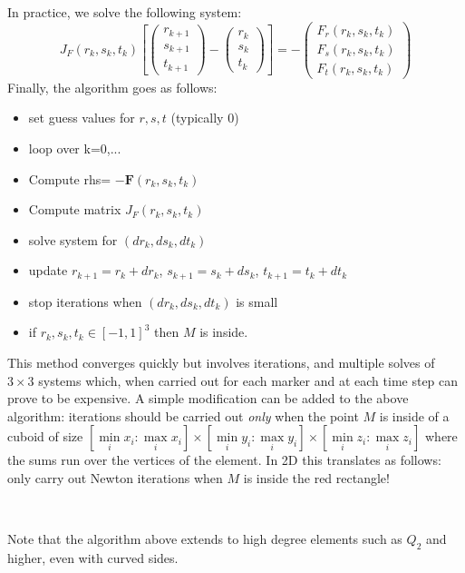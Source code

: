 In practice, we solve the following system:
\[
J_F(r_k,s_k,t_k) 
\left[  
\left(
\begin{array}{c}
r_{k+1} \\s_{k+1} \\ t_{k+1}
\end{array}
\right)
-
\left(
\begin{array}{c}
r_{k} \\s_{k} \\ t_{k}
\end{array}
\right)
\right]=-
\left(
\begin{array}{c}
F_r(r_k,s_k,t_k) \\
F_s(r_k,s_k,t_k)\\
F_t(r_k,s_k,t_k)
\end{array}
\right)
\]
Finally, the algorithm goes as follows:
\begin{itemize}
\item set guess values for $r,s,t$ (typically 0)
\item loop over k=0,...
\item Compute rhs= $-{\bm F}(r_k,s_k,t_k)$ 
\item Compute matrix $J_F(r_k,s_k,t_k)$
\item solve system for $(dr_k,ds_k,dt_k)$
\item update $r_{k+1}=r_k+dr_k$, $s_{k+1}=s_k+ds_k$, $t_{k+1}=t_k+dt_k$ 
\item stop iterations when $(dr_k,ds_k,dt_k)$ is small
\item if $r_k,s_k,t_k\in[-1,1]^3$ then $M$ is inside.
\end{itemize}
This method converges quickly but involves iterations, and multiple solves of $3\times 3$ systems which, 
when carried out for each marker and at each time step can prove to be expensive. 
A simple modification can be added to the above algorithm: iterations should be carried out {\it only}
when the point $M$ is inside of a cuboid of size $[\min\limits_i{x_i}:\max\limits_i{x_i}]\times[\min\limits_i{y_i}:\max\limits_i{y_i} ]
\times[\min\limits_i{z_i}:\max\limits_i{z_i}]$ where the sums run over the vertices of the element. 
In 2D this translates as follows: only carry out Newton iterations when $M$ is inside the red rectangle!
\begin{center}
\\
\end{center}

Note that the algorithm above extends to high degree elements such as $Q_2$ and higher, even with curved sides.





